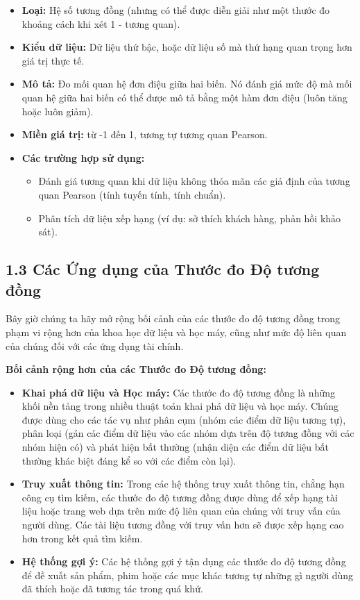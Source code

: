 \begin{itemize}
  \item \textbf{Loại:} Hệ số tương đồng (nhưng có thể được diễn giải như một thước đo khoảng cách khi xét 1 - tương quan).
  \item \textbf{Kiểu dữ liệu:} Dữ liệu thứ bậc, hoặc dữ liệu số mà thứ hạng quan trọng hơn giá trị thực tế.
  \item \textbf{Mô tả:} Đo mối quan hệ đơn điệu giữa hai biến. Nó đánh giá mức độ mà mối quan hệ giữa hai biến có thể được mô tả bằng một hàm đơn điệu (luôn tăng hoặc luôn giảm).
  \item \textbf{Miền giá trị:} từ -1 đến 1, tương tự tương quan Pearson.
  \item \textbf{Các trường hợp sử dụng:}
  \begin{itemize}
    \item Đánh giá tương quan khi dữ liệu không thỏa mãn các giả định của tương quan Pearson (tính tuyến tính, tính chuẩn).
    \item Phân tích dữ liệu xếp hạng (ví dụ: sở thích khách hàng, phản hồi khảo sát).
  \end{itemize}
\end{itemize}

\subsection{1.3 Các Ứng dụng của Thước đo Độ tương đồng}

Bây giờ chúng ta hãy mở rộng bối cảnh của các thước đo độ tương đồng trong phạm vi rộng hơn của khoa học dữ liệu và học máy, cũng như mức độ liên quan của chúng đối với các ứng dụng tài chính.

\textbf{Bối cảnh rộng hơn của các Thước đo Độ tương đồng:}

\begin{itemize}
  \item \textbf{Khai phá dữ liệu và Học máy:} Các thước đo độ tương đồng là những khối nền tảng trong nhiều thuật toán khai phá dữ liệu và học máy. Chúng được dùng cho các tác vụ như phân cụm (nhóm các điểm dữ liệu tương tự), phân loại (gán các điểm dữ liệu vào các nhóm dựa trên độ tương đồng với các nhóm hiện có) và phát hiện bất thường (nhận diện các điểm dữ liệu bất thường khác biệt đáng kể so với các điểm còn lại).
  \item \textbf{Truy xuất thông tin:} Trong các hệ thống truy xuất thông tin, chẳng hạn công cụ tìm kiếm, các thước đo độ tương đồng được dùng để xếp hạng tài liệu hoặc trang web dựa trên mức độ liên quan của chúng với truy vấn của người dùng. Các tài liệu tương đồng với truy vấn hơn sẽ được xếp hạng cao hơn trong kết quả tìm kiếm.
  \item \textbf{Hệ thống gợi ý:} Các hệ thống gợi ý tận dụng các thước đo độ tương đồng để đề xuất sản phẩm, phim hoặc các mục khác tương tự những gì người dùng đã thích hoặc đã tương tác trong quá khứ.
\end{itemize}

